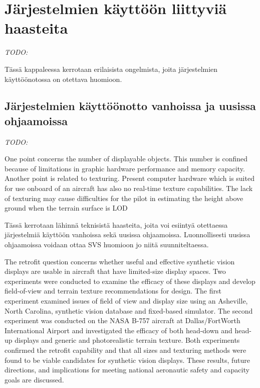 \documentclass[utf8,bachelor,manualbib]{gradu3}
\begin{document}
\chapter{Järjestelmien käyttöön liittyviä haasteita} \emph{TODO:}

Tässä kappaleessa kerrotaan erilaisista ongelmista, joita järjestelmien käyttöönotossa on otettava huomioon.

\section{Järjestelmien käyttöönotto vanhoissa ja uusissa ohjaamoissa} \emph{TODO:}

One point concerns the number of displayable objects. This
number is confined because of limitations in graphic hardware
performance and memory capacity. Another point is related to
texturing. Present computer hardware which is suited for use
onboard of an aircraft has also no real-time texture capabilities.
The lack of texturing may cause difficulties for the pilot in
estimating the height above ground when the terrain surface is
LOD \citep{mollersachs1994}

Tässä kerrotaan lähinnä teknisistä haasteita, joita voi esiintyä otettaessa järjestelmiä käyttöön vanhoissa sekä uusissa ohjaamoissa. Luonnollisesti uusissa ohjaamoissa voidaan ottaa SVS huomioon jo niitä suunniteltaessa.

The retrofit question concerns whether useful and effective synthetic vision displays
are usable in aircraft that have limited-size display spaces. Two experiments were
conducted to examine the efficacy of these displays and develop field-of-view and
terrain texture recommendations for design. The first experiment examined issues of
field of view and display size using an Asheville, North Carolina, synthetic vision database
and fixed-based simulator. The second experiment was conducted on the
NASA B-757 aircraft at Dallas/FortWorth International Airport and investigated the
efficacy of both head-down and head-up displays and generic and photorealistic terrain
texture. Both experiments confirmed the retrofit capability and that all sizes and
texturing methods were found to be viable candidates for synthetic vision displays.
These results, future directions, and implications for meeting national aeronautic
safety and capacity goals are discussed. \citep{prinzel2004}
\end{document}
